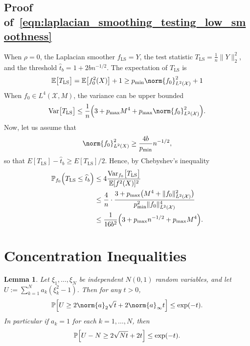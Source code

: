 \documentclass[twoside]{article}
\newcommand{\Var}{\mathrm{Var}}
\newcommand{\1}{\mathbf{1}}
\newcommand{\Xset}{\mathcal{X}}
\newcommand{\Leb}{L}
\newcommand{\Pbb}{\mathbb{P}}
\newcommand{\Ebb}{\mathbb{E}}
\newcommand{\wh}[1]{\widehat{#1}}
\newcommand{\LS}{\mathrm{LS}}
\newtheorem{lemma}{Lemma}
\theoremstyle{definition}
\theoremstyle{remark}
\begin{document}
\subsection{Proof of~\eqref{eqn:laplacian_smoothing_testing_low_smoothness}}
When $\rho = 0$, the Laplacian smoother $\wh{f}_{\LS} = Y$, the test statistic $T_{\LS} = \frac{1}{n}\|Y\|_2^2$, and the threshold $\wh{t}_b = 1 + 2bn^{-1/2}$. The expectation of $T_{\LS}$ is 
\begin{equation*}
\Ebb\bigl[T_{\LS}\bigr] = \mathbb{E}\bigl[f_0^2(X)\bigr] + 1 \geq p_{\min} \norm{f_0}_{\Leb^2(\Xset)}^2 + 1
\end{equation*}
When $f_0 \in \Leb^4(\Xset,M)$, the variance can be upper bounded
\begin{equation*}
\Var\bigl[T_{\LS}\bigr] \leq \frac{1}{n}\Bigl(3 + p_{\max} M^4 + p_{\max}\norm{f_0}_{\Leb^2(\Xset)}^2\Bigr).
\end{equation*}
Now, let us assume that
\begin{equation*}
\norm{f_0}_{\Leb^2(X)}^2 \geq \frac{4b}{p_{\min}} n^{-1/2},
\end{equation*}
so that $E[T_{\LS}] - \wh{t}_b \geq E[T_{\LS}]/2$. Hence, by Chebyshev's inequality
\begin{align*}
\mathbb{P}_{f_0}\Bigl(T_{\LS} \leq \wh{t}_b \Bigr) & \leq 4 \frac{\Var_{f_0}\bigl[T_{\LS}\bigr]}{\mathbb{E}[f^2(X)]^2} \\
& \leq \frac{4}{n} \cdot \frac{ 3 + p_{\max}\bigl(M^4 + \|f_0\|_{\Leb^2(\Xset)}^2 \bigr)}{p_{\min}^2 \|f_0\|_{\Leb^2(\Xset)}^4} \\
& \leq \frac{1}{16b^2}\Bigl(3 + p_{\max}n^{-1/2} + p_{\max}M^4\Bigr).
\end{align*}

\section{Concentration Inequalities}
\begin{lemma}
	\label{lem:chi_square_bound}
	Let $\xi_1,\ldots,\xi_N$ be independent $N(0,1)$ random variables, and let $U := \sum_{k = 1}^{N} a_k(\xi_k^2 - 1)$.  Then for any $t > 0$,
	\begin{equation*}
	\Pbb\Bigl[U \geq 2 \norm{a}_2 \sqrt{t} + 2 \norm{a}_{\infty}t\Bigr] \leq \exp(-t).
	\end{equation*}
	In particular if $a_k = 1$ for each $k = 1,\ldots,N$, then
	\begin{equation*}
	\Pbb\Bigl[U - N \geq 2\sqrt{N t} + 2t\Bigr] \leq \exp(-t).
	\end{equation*}
\end{lemma}
\end{document}
